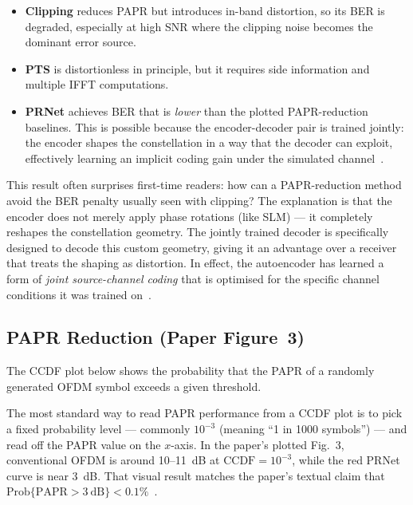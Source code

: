 \begin{itemize}
    \item \textbf{Clipping} reduces PAPR but introduces in-band distortion, so its BER is degraded, especially at high SNR where the clipping noise becomes the dominant error source.
    \item \textbf{PTS} is distortionless in principle, but it requires side information and multiple IFFT computations.
    \item \textbf{PRNet} achieves BER that is \emph{lower} than the plotted PAPR-reduction baselines.  This is possible because the encoder-decoder pair is trained jointly: the encoder shapes the constellation in a way that the decoder can exploit, effectively learning an implicit coding gain under the simulated channel~\cite{kim2017novel}.
\end{itemize}

\begin{keyinsight}
    This result often surprises first-time readers: how can a PAPR-reduction method avoid the BER penalty usually seen with clipping?  The explanation is that the encoder does not merely apply phase rotations (like SLM) --- it completely reshapes the constellation geometry.  The jointly trained decoder is specifically designed to decode this custom geometry, giving it an advantage over a receiver that treats the shaping as distortion.  In effect, the autoencoder has learned a form of \emph{joint source-channel coding} that is optimised for the specific channel conditions it was trained on~\cite{kim2017novel}.
\end{keyinsight}


\subsection{PAPR Reduction (Paper Figure~3)}

The CCDF plot below shows the probability that the PAPR of a randomly generated OFDM symbol exceeds a given threshold.
\begin{keyinsight}
    The most standard way to read PAPR performance from a CCDF plot is to pick a fixed probability level --- commonly $10^{-3}$ (meaning ``1 in 1000 symbols'') --- and read off the PAPR value on the $x$-axis. In the paper's plotted Fig.~3, conventional OFDM is around 10--11~dB at $\mathrm{CCDF} = 10^{-3}$, while the red PRNet curve is near 3~dB.  That visual result matches the paper's textual claim that $\mathrm{Prob}\{\mathrm{PAPR}>3~\mathrm{dB}\}<0.1\%$~\cite{kim2017novel}.
\end{keyinsight}


